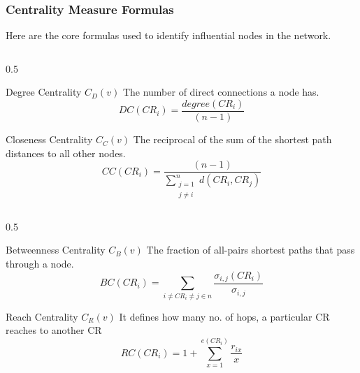 \documentclass{beamer}
\begin{document}
\begin{frame}
  \frametitle{Centrality Measure Formulas}
  \justify
  Here are the core formulas used to identify influential nodes in the network.
  \begin{columns}[T]
    \begin{column}{0.5\textwidth}
      \begin{block}{Degree Centrality $C_D(v)$}
      The number of direct connections a node has.
      \begin{equation}
DC(CR_i) = \frac{degree(CR_i)}{(n - 1)}
\end{equation}

      \end{block}
      \begin{block}{Closeness Centrality $C_C(v)$}
      The reciprocal of the sum of the shortest path distances to all other nodes.
      \begin{equation}
CC(CR_i) = \frac{(n - 1)}{\displaystyle \sum_{\substack{j = 1 \\ j \neq i}}^{n} d(CR_i, CR_j)}
\end{equation}

      \end{block}
    \end{column}
     \end{columns}
   \end{frame}
   
    \begin{frame}
    
     \begin{columns}
        
    
    \begin{column}{0.5\textwidth}
      \begin{block}{Betweenness Centrality $C_B(v)$}
      The fraction of all-pairs shortest paths that pass through a node.
      \begin{equation}
          BC(CR_i) = \sum_{i \neq CR_i \neq j \in n} \frac{\sigma_{i,j}(CR_i)}{\sigma_{i,j}}
      \end{equation}
      \end{block}
      \begin{block}{Reach Centrality $C_R(v)$}
      It defines how many no. of hops, a particular CR reaches to another CR
     \begin{equation}
RC(CR_i) = 1 + \sum_{x = 1}^{e(CR_i)} \frac{r_{ix}}{x}
\end{equation}

      
      \end{block}
    \end{column}
  \end{columns}
\end{frame}
\end{document}
